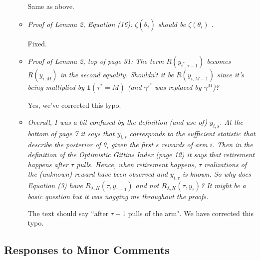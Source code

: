 \documentclass[11pt]{article}
\newcommand{\1}{\ensuremath{\mathbf{1}}} %
\theoremstyle{thm-sf}
\begin{document}
\begin{enumerate}
\begin{itemize}
			 Same as above.
			 
			 \item {\it Proof of Lemma 2, Equation (16): $\zeta(\hat \theta_i)$ should be $\zeta(\theta_i)$ .}
			 
			 Fixed.
			 
			 \item {\it 
			 	Proof of Lemma 2, top of page 31: The term  $R(y_{i^*, \tau - 1})$ becomes $R(y_{i,M})$ in the second equality. Shouldn't it be $R(y_{i,M-1})$ since it's being multiplied by $\mathbf 1(\tau^* = M)$ (and $\gamma^{\tau^*}$ was replaced by $\gamma^M$)?
			 }
			 
			 Yes, we've corrected this typo.
		 
		 	\item {\it Overall, I was a bit confused by the definition (and use of) $y_{i,s}$. At the bottom of page 7 it says that $y_{i,s}$ corresponds to the sufficient statistic that describe the posterior of $\theta_i$ given the first $s$ rewards of arm $i$. Then in the definition of the Optimistic Gittins Index (page 12) it says that retirement happens after $\tau$ pulls. Hence, when retirement happens, $\tau$ realizations of the (unknown) reward have been observed and $y_{i,\tau}$ is known. 
		 		So why does Equation (3) have $R_{\lambda,K}(\tau, y_{\tau-1})$ and not $R_{\lambda,K}(\tau, y_{\tau})$? It might be a basic question but it was nagging me throughout the proofs.
	 		}
	 		
	 		The text should say ``after $\tau -1$ pulls of the arm". We have corrected this typo.
			 
			 
		\end{itemize}
	
	\end{enumerate}

	\subsection{Responses to Minor Comments}
	
\end{document}

